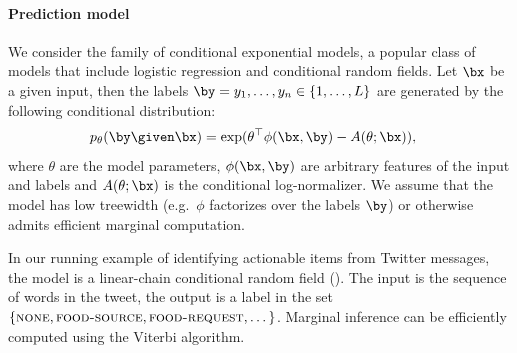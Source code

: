 
\paragraph{Prediction model}
We consider the family of conditional exponential models, a popular class of models that include logistic regression and conditional random fields.
Let $\bx$ be a given input, then the labels $\by = y_1, \ldots, y_n \in \{1, \dots, L\}$ are generated by the following conditional distribution:
\begin{align*}
  \p(\by \given \bx) 
  &= \exp( \theta^\top \phi(\bx, \by) - A(\theta; \bx)),
\end{align*}
where $\theta$ are the model parameters,
$\phi(\bx, \by)$ are arbitrary features of the input and labels and 
$A(\theta; \bx)$ is the conditional log-normalizer.
We assume that the model has low treewidth (e.g.\ $\phi$ factorizes over the labels $\by$) or otherwise admits efficient marginal computation.

In our running example of identifying actionable items from Twitter messages, the model is a linear-chain conditional random field (). The input is the sequence of words in the tweet, the output is a label in the set $\{\textsc{none}, \textsc{food-source},  \textsc{food-request}, \dots\}$. Marginal inference can be efficiently computed using the Viterbi algorithm.


